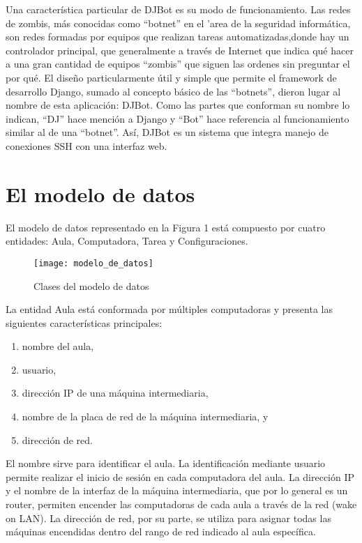 \documentclass[runningheads,a4paper,titlepage]{llncs}
\begin{document}
Una caracter\'istica particular de DJBot es su modo de funcionamiento. Las redes
de zombis, m\'as conocidas como ``botnet'' en el 'area de la seguridad
inform\'atica, son redes formadas por equipos que realizan tareas automatizadas,donde hay un controlador principal, que generalmente a través de Internet que indica qué hacer a
una gran cantidad de equipos ``zombis'' que siguen las ordenes sin preguntar el
por qué. El dise\~no particularmente \'util y simple que permite el framework de
desarrollo Django, sumado al concepto b\'asico de las ``botnets'', dieron lugar al
nombre de esta aplicación: DJBot\cite{djbot}. Como las partes que conforman su
nombre lo indican, ``DJ'' hace mención a Django y ``Bot'' hace referencia al
funcionamiento similar al de una ``botnet''. As\'i, DJBot es un sistema que
integra manejo de conexiones SSH con una interfaz web.




\section{El modelo de datos}

\noindent El modelo de datos representado en la Figura 1 est\'a compuesto por cuatro
entidades: Aula, Computadora, Tarea y Configuraciones.

\begin{figure}
\centering
\texttt{[image: modelo\_de\_datos]}
\caption{Clases del modelo de datos}
\label{fig:Modelo de datos}
\end{figure}


La entidad Aula est\'a conformada por m\'ultiples computadoras y presenta las
siguientes caracter\'isticas principales:
\begin{enumerate}
\item{nombre del aula,}
\item{usuario,}
\item{direcci\'on IP de una m\'aquina intermediaria,}
\item{nombre de la placa de red de la m\'aquina intermediaria, y}
\item{direcci\'on de red.}
\end{enumerate}
El nombre sirve para identificar el aula. La identificaci\'on mediante usuario
permite realizar el inicio de sesi\'on en cada computadora del aula. La
direcci\'on IP y el nombre de la interfaz de la m\'aquina intermediaria, que por
lo general es un router, permiten encender las computadoras de cada aula a
trav\'es de la red (wake on LAN). La direcci\'on de red, por su parte, se
utiliza para asignar todas las m\'aquinas encendidas dentro del rango de red
indicado al aula espec\'ifica.
\end{document}
